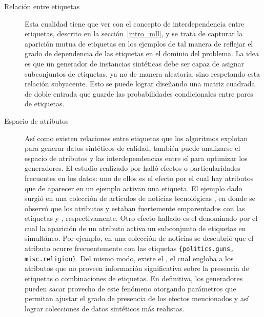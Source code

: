 \begin{description}
	\item[Relación entre etiquetas] Esta cualidad tiene que ver con el concepto de
	      interdependencia entre etiquetas, descrito en la sección~\ref{intro_mll},
	      y se trata de capturar la aparición mutua de etiquetas en los ejemplos de
	      tal manera de reflejar el grado de dependencia de las etiquetas en el
	      dominio del problema. La idea es que un generador de instancias sintéticas
	      debe ser capaz de asignar subconjuntos de etiquetas, ya no de manera
	      aleatoria, sino respetando esta relación subyacente. Esto se puede lograr
	      diseñando una matriz cuadrada de doble entrada que guarde las
	      probabilidades condicionales entre pares de etiquetas.

	\item[Espacio de atributos] Así como existen relaciones entre etiquetas que
	      los algoritmos explotan para generar datos sintéticos de calidad, también
	      puede analizarse el espacio de atributos y las interdependencias entre sí
	      para optimizar los generadores. El estudio realizado por
	      \citeauthor{read_generating_2009} halló efectos o particularidades
	      frecuentes en los datos: uno de ellos es el efecto
	       por el cual hay atributos que de aparecer en
	      un ejemplo activan una etiqueta. El ejemplo dado surgió en una colección
	      de artículos de noticias tecnológicas \cite{read_classifier_2011}, en
	      donde se observó que los atributos  y
	       estaban fuertemente emparentados con las
	      etiquetas  y ,
	      respectivamente. Otro efecto hallado es el denominado
	       por el cual la aparición de un atributo
	      activa un subconjunto de etiquetas en simultáneo. Por ejemplo, en una
	      colección de noticias \cite{lang_newsweeder_1995} se descubrió que el
	      atributo  ocurre frecuentemente con las etiquetas
	      \texttt{\{politics.guns, misc.religion\}}. Del mismo modo, existe el
	      , el cual engloba a los atributos que no proveen
	      información significativa sobre la presencia de etiquetas o combinaciones
	      de etiquetas. En definitiva, los generadores pueden sacar provecho de este
	      fenómeno otorgando parámetros que permitan ajustar el grado de presencia
	      de los efectos mencionados y así lograr colecciones de datos sintéticos
	      más realistas.

\end{description}
